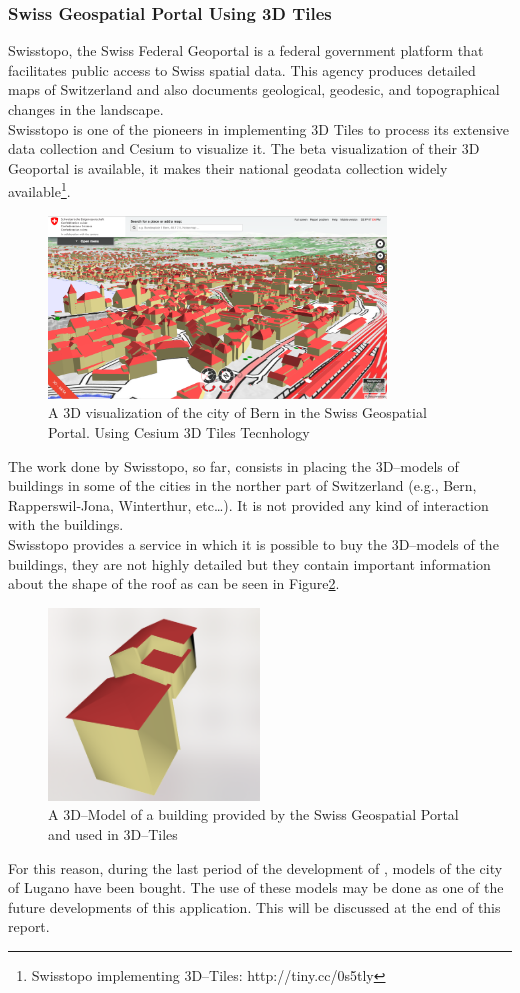 \subsubsection{Swiss Geospatial Portal Using 3D Tiles}
Swisstopo, the Swiss Federal Geoportal is a federal government platform that facilitates public access to Swiss spatial data.
This agency produces detailed maps of Switzerland and also documents geological, geodesic, and topographical changes in the landscape.\\
Swisstopo is one of the pioneers in implementing 3D Tiles to process its extensive data collection and Cesium to visualize it. The beta visualization of their 3D Geoportal is available, it makes their national geodata collection widely available\footnote{Swisstopo implementing 3D--Tiles: http://tiny.cc/0s5tly}.
\begin{figure} [H]
\centering
\includegraphics[width=0.8\textwidth]{chapter2/images/BernCitySwissTopo}
\caption{A 3D visualization of the city of Bern in the Swiss Geospatial Portal. Using Cesium 3D Tiles Tecnhology}
\label{fig:BernCitySwissTopo}
\end{figure}
The work done by Swisstopo, so far, consists in placing the 3D--models of buildings in some of the cities in the norther part of Switzerland (e.g., Bern, Rapperswil-Jona, Winterthur, etc\dots ). It is not provided any kind of interaction with the buildings.\\
Swisstopo provides a service in which it is possible to buy the 3D--models of the buildings, they are not highly detailed but they contain important information about the shape of the roof as can be seen in Figure\ref{fig:swisstopoBuildingModel}.
\begin{figure} [H]
\centering
\includegraphics[width=0.5\textwidth]{chapter2/images/swisstopoBuildingModel}
\caption{A 3D--Model of a building provided by the Swiss Geospatial Portal and used in 3D--Tiles}
\label{fig:swisstopoBuildingModel}
\end{figure}
For this reason, during the last period of the development of \applicationName, models of the city of Lugano have been bought. The use of these models may be done as one of the future developments of this application. This will be discussed at the end of this report.
